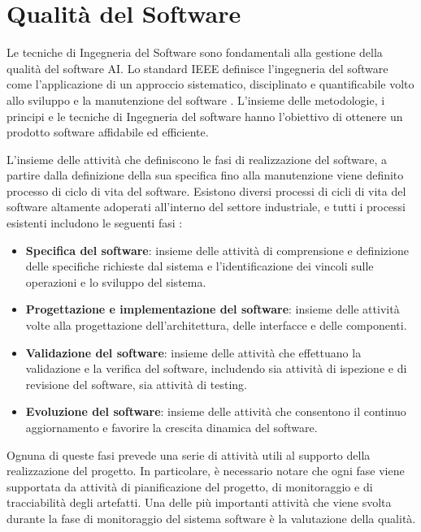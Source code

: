 
\section{Qualità del Software}
Le tecniche di Ingegneria del Software sono fondamentali alla gestione della qualità del software AI.
Lo standard IEEE definisce l'ingegneria del software come l'applicazione di un approccio sistematico, disciplinato e quantificabile volto allo sviluppo e la manutenzione del software \cite{IEEE610}.
L'insieme delle metodologie, i principi e le tecniche di Ingegneria del software hanno l'obiettivo di ottenere un prodotto software affidabile ed efficiente.

L'insieme delle attività che definiscono le fasi di realizzazione del software, a partire dalla definizione della sua specifica fino alla manutenzione viene definito processo di ciclo di vita del software.
Esistono diversi processi di cicli di vita del software altamente adoperati all'interno del settore industriale, e tutti i processi esistenti includono le seguenti fasi \cite{Sommerville}:

\begin{itemize}
    \item \textbf{Specifica del software}: insieme delle attività di comprensione e definizione delle specifiche richieste dal sistema e l'identificazione dei vincoli sulle operazioni e lo sviluppo del sistema.
    
    \item \textbf{Progettazione e implementazione del software}: insieme delle attività volte alla progettazione dell'architettura, delle interfacce e delle componenti.
    
    \item \textbf{Validazione del software}: insieme delle attività che effettuano la validazione e la verifica del software, includendo sia attività di ispezione e di revisione del software, sia attività di testing.
    
    \item \textbf{Evoluzione del software}: insieme delle attività che consentono il continuo aggiornamento e favorire la crescita dinamica del software.
    
\end{itemize}
Ognuna di queste fasi prevede una serie di attività utili al supporto della realizzazione del progetto. In particolare, è necessario notare che ogni fase viene supportata da attività di pianificazione del progetto, di monitoraggio e di tracciabilità degli artefatti.
Una delle più importanti attività che viene svolta durante la fase di monitoraggio del sistema software è la valutazione della qualità.

